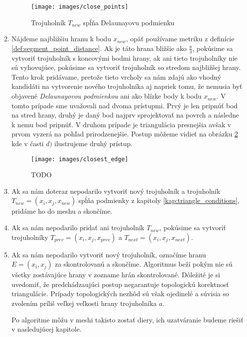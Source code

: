 \begin{enumerate}
{        \begin{figure}
            \centerline{\texttt{[image: images/close\_points]}}
            \caption[Trojuholník $T_{new}$ spĺňa Delaunayovu podmienku]{Trojuholník $T_{new}$ spĺňa Delaunayovu podmienku}
            \label{obr:close_points}
        \end{figure}
    }
    \item{
        Nájdeme najbližšiu hranu k bodu $x_{new}$, opäť používame metriku z definície 
        \ref{def:segment_point_distance}. Ak je táto hrana bližšie ako $\frac{a}{3}$, 
        pokúsime sa vytvoriť trojuholník s koncovými bodmi hrany, ak ani tieto trojuholníky 
        nie sú vyhovujúce, pokúsime sa vytvoriť trojuholník so stredom najbližšej hrany.
        Tento krok pridávame, pretože
        tieto vrcholy sa nám zdajú ako vhodný kandidáti na vytvorenie nového trojuholníka
        aj napriek tomu, že nemusia byť objavené \textit{Delaunayovou podmienkou} ani ako 
        blízke body k bodu $x_{new}$. V tomto prípade sme uvažovali nad dvoma prístupmi. 
        Prvý je len pripnúť 
        bod na stred hrany, druhý je daný bod najprv sprojektovať na povrch a následne k nemu bod 
        pripnúť. V druhom prípade je triangulácia presnejšia avšak v prvom vyzerá na pohľad 
        prirodzenejšie. Postup môžeme vidieť na obrázku \ref{obr:closest_edge} kde
        v časti $d)$ ilustrujeme druhý prístup.

        \begin{figure}
            \centerline{\texttt{[image: images/closest\_edge]}}
            \caption[TODO]{TODO}
            \label{obr:closest_edge}
        \end{figure}
    }
    \item{
        Ak sa nám doteraz nepodarilo vytvoriť nový trojuholník a trojuholník $T_{new} = (x_i, x_j, x_{new})$
        spĺňa podmienky z kapitoly \ref{kap:triangle_conditions}, pridáme ho do meshu a skončíme.
    }
    \item{
        Ak sa nám nepodarilo pridať ani trojuholník $T_{new}$, pokúsime sa vytvoriť trojuholníky 
        $T_{prev} = (x_i, x_j, x_{prev})$ a $T_{next} = (x_i, x_j, x_{next})$.
    }
    \item{
        Ak sa nám nepodarilo vytvoriť nový trojuholník, označíme hranu $E = (x_i, x_j)$ za skontrolovanú
        a skončíme.
    }
    Algoritmus beží pokým nie sú všetky zostávajúce hrany v zozname hrán skontrolované. 
    Dôležité je si uvedomiť, že predchádzaujúci postup negarantuje topologickú korektnosť
    triangulácie. Prípady topologických nezhôd sú však ojedinelé a súvisia so zvolením príliš
    veľkej veľkosti hrany trojuholníka $a$.

    Po algoritme môžu v meshi takisto zostať diery, ich uzatváranie budeme riešiť v nasledujúcej kapitole.
\end{enumerate}

